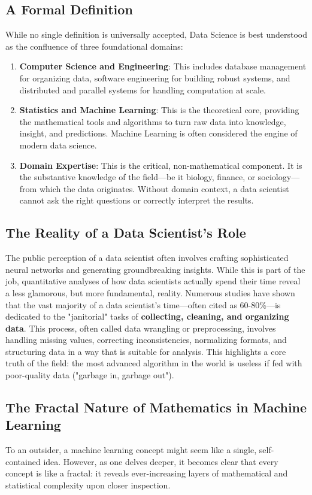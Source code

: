 \subsection*{A Formal Definition}
While no single definition is universally accepted, Data Science is best understood as the confluence of three foundational domains:
\begin{enumerate}
    \item \textbf{Computer Science and Engineering}: This includes database management for organizing data, software engineering for building robust systems, and distributed and parallel systems for handling computation at scale.
    \item \textbf{Statistics and Machine Learning}: This is the theoretical core, providing the mathematical tools and algorithms to turn raw data into knowledge, insight, and predictions. Machine Learning is often considered the engine of modern data science.
    \item \textbf{Domain Expertise}: This is the critical, non-mathematical component. It is the substantive knowledge of the field—be it biology, finance, or sociology—from which the data originates. Without domain context, a data scientist cannot ask the right questions or correctly interpret the results.
\end{enumerate}

\subsection*{The Reality of a Data Scientist's Role}
The public perception of a data scientist often involves crafting sophisticated neural networks and generating groundbreaking insights. While this is part of the job, quantitative analyses of how data scientists actually spend their time reveal a less glamorous, but more fundamental, reality. Numerous studies have shown that the vast majority of a data scientist's time—often cited as 60-80\%—is dedicated to the "janitorial" tasks of \textbf{collecting, cleaning, and organizing data}. This process, often called data wrangling or preprocessing, involves handling missing values, correcting inconsistencies, normalizing formats, and structuring data in a way that is suitable for analysis. This highlights a core truth of the field: the most advanced algorithm in the world is useless if fed with poor-quality data ("garbage in, garbage out").

\subsection*{The Fractal Nature of Mathematics in Machine Learning}
To an outsider, a machine learning concept might seem like a single, self-contained idea. However, as one delves deeper, it becomes clear that every concept is like a fractal: it reveals ever-increasing layers of mathematical and statistical complexity upon closer inspection.

